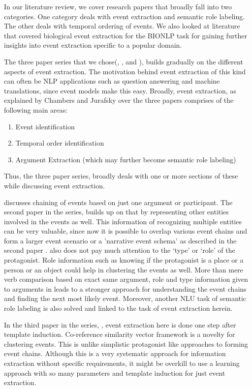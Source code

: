 In our literature review, we cover research papers that broadly fall into two categories. One category deals with event extraction and semantic role labeling. The other deals with temporal ordering of events. We also looked at literature that covered biological event extraction for the BIONLP task for gaining further insights into event extraction specific to a popular domain.

The three paper series that we chose(\citeauthor{chju2008ec}, \citeauthor{chju2009}, and \citeauthor{chju2011}), builds gradually on the different aspects of event extraction. The motivation behind event extraction of this kind can often be NLP applications such as question answering and machine translations, since event models make this easy. Broadly, event extraction, as explained by Chambers and Jurafsky over the three papers comprises of the following main areas:
\begin{enumerate}
\item Event identification
\item Temporal order identification 
\item Argument Extraction (which may further become semantic role labeling)
\end{enumerate} Thus, the three paper series, broadly deals with one or more sections of these while discussing event extraction.

\citeauthor{chju2008ec} discusses chaining of events based on just one argument or participant. The second paper in the series, \citeauthor{chju2009} builds up on that by representing other entities involved in the events as well. This information of recognizing multiple entities can be very valuable, since now it is possible to overlap various event chains and form a larger event scenario or a 'narrative event schema' as described in the second paper \citeauthor{chju2009}. 
\citeauthor{chju2008ec} also does not pay much attention to the ‘type’ or ‘role’ of the protagonist. Role information such as knowing if the protagonist is a place or a person or an object could help in clustering the events as well. More than mere verb comparison based on exact same argument, role and type information given to arguments in \citeauthor{chju2009} leads to a stronger approach for understanding the event chains and finding the next most likely event. Moreover,  another NLU task of semantic role labeling is also solved and linked to the task of event extraction herein.

In the third paper in the series, \citeauthor{chju2011}, event extraction here is done one step after template induction. Co-reference similarity vector framework is a novelty for clustering events. This is unlike simplistic protagonist like approaches to forming event chains. Although this is a very systematic approach for information extraction without specific requirements, it might be overkill to use a learning approach with so many parameters and template induction for just event extraction.
